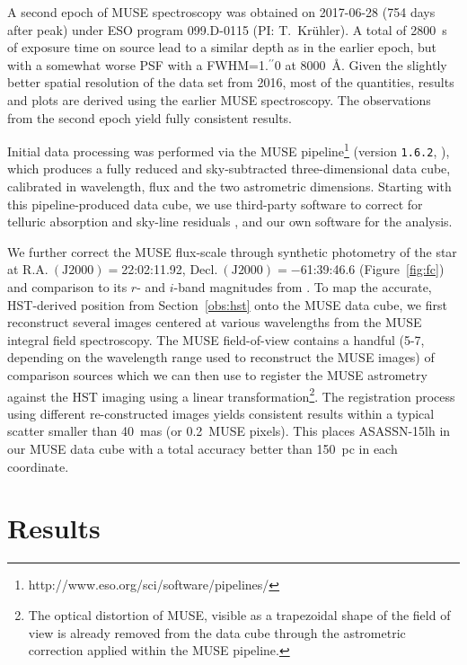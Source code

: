 \documentclass[traditabstract]{aa}
\newcommand{\farc}{\hbox{$.\!\!^{\prime\prime}$}}
\begin{document}
A second epoch of MUSE spectroscopy was obtained on 2017-06-28 (754 days after peak) under ESO program 099.D-0115 (PI: T.~Kr\"uhler). A total of 2800~s of exposure time on source lead to a similar depth as in the earlier epoch, but with a somewhat worse PSF with a FWHM=1\farc{0} at 8000~\AA. Given the slightly better spatial resolution of the data set from 2016, most of the quantities, results and plots are derived using the earlier MUSE spectroscopy. The observations from the second epoch yield fully consistent results.

Initial data processing was performed via the MUSE pipeline\footnote{http://www.eso.org/sci/software/pipelines/} (version \texttt{1.6.2}, \citealt{2014ASPC..485..451W}), which produces a fully reduced and sky-subtracted three-dimensional data cube, calibrated in wavelength, flux and the two astrometric dimensions. Starting with this pipeline-produced data cube, we use third-party software to correct for telluric absorption \citep[\texttt{molecfit};][]{2015A&A...576A..77S} and sky-line residuals  \citep[\texttt{zap};][]{2016MNRAS.458.3210S}, and our own software for the analysis.

We further correct the MUSE flux-scale through synthetic photometry of the star at $\mathrm{R.A.~(J2000)}=$22:02:11.92, $\mathrm{Decl.~(J2000)} = -$61:39:46.6 (Figure~\ref{fig:fc}) and comparison to its $r$- and $i$-band magnitudes from \citet{2016NatAs...1E...2L}. To map the accurate, HST-derived position from Section~\ref{obs:hst} onto the MUSE data cube, we first reconstruct several images centered at various wavelengths from the MUSE integral field spectroscopy. The MUSE field-of-view contains a handful (5-7, depending on the wavelength range used to reconstruct the MUSE images) of comparison sources which we can then use to register the MUSE astrometry against the HST imaging using a linear transformation\footnote{The optical distortion of MUSE, visible as a trapezoidal shape of the field of view is already removed from the data cube through the astrometric correction applied within the MUSE pipeline.}. The registration process using different re-constructed images yields consistent results within a typical scatter smaller than 40~mas (or 0.2~MUSE pixels). This places ASASSN-15lh in our MUSE data cube with a total accuracy better than 150~pc in each coordinate.

\section{Results}
\label{sec:Res}
\end{document}
